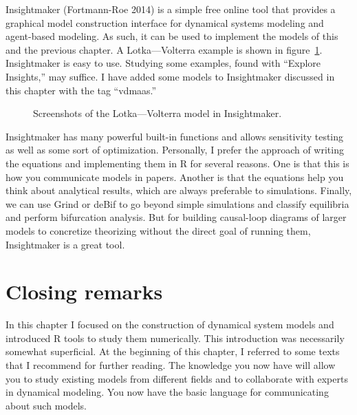 \documentclass[
  a4paper,
  DIV=11,
  numbers=noendperiod,
  oneside]{scrreprt}
\begin{document}
Insightmaker (Fortmann-Roe 2014) is a simple free online tool that
provides a graphical model construction interface for dynamical systems
modeling and agent-based modeling. As such, it can be used to implement
the models of this and the previous chapter. A Lotka---Volterra example
is shown in figure~\ref{fig-ch4n-img21-old-69}. Insightmaker is easy to
use. Studying some examples, found with ``Explore Insights,'' may
suffice. I have added some models to Insightmaker discussed in this
chapter with the tag ``vdmaas.''

\begin{figure}


\caption{\label{fig-ch4n-img21-old-69}Screenshots of the
Lotka---Volterra model in Insightmaker.}

\end{figure}%

Insightmaker has many powerful built-in functions and allows sensitivity
testing as well as some sort of optimization. Personally, I prefer the
approach of writing the equations and implementing them in R for several
reasons. One is that this is how you communicate models in papers.
Another is that the equations help you think about analytical results,
which are always preferable to simulations. Finally, we can use Grind or
deBif to go beyond simple simulations and classify equilibria and
perform bifurcation analysis. But for building causal-loop diagrams of
larger models to concretize theorizing without the direct goal of
running them, Insightmaker is a great tool.

\section{Closing remarks}\label{sec-Closing-Remarks}

In this chapter I focused on the construction of dynamical system models
and introduced R tools to study them numerically. This introduction was
necessarily somewhat superficial. At the beginning of this chapter, I
referred to some texts that I recommend for further reading. The
knowledge you now have will allow you to study existing models from
different fields and to collaborate with experts in dynamical modeling.
You now have the basic language for communicating about such models.
\end{document}
